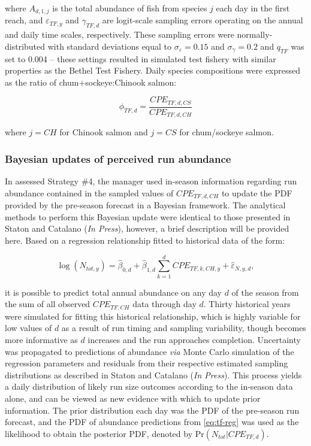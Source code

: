 \documentclass[12pt,]{book}
\theoremstyle{definition}
\theoremstyle{definition}
\theoremstyle{definition}
\theoremstyle{remark}
\begin{document}
\noindent
where \(A_{d,1,j}\) is the total abundance of fish from species \(j\)
each day in the first reach, and \(\varepsilon_{TF,y}\) and
\(\gamma_{TF,d}\) are logit-scale sampling errors operating on the
annual and daily time scales, respectively. These sampling errors were
normally-distributed with standard deviations equal to
\(\sigma_{\varepsilon} = 0.15\) and \(\sigma_{\gamma} = 0.2\) and
\(q_{TF}\) was set to 0.004 -- these settings resulted in simulated test
fishery with similar properties as the Bethel Test Fishery. Daily
species compositions were expressed as the ratio of chum+sockeye:Chinook
salmon:

\begin{equation}
  \phi_{TF,d} = \frac{CPE_{TF,d,CS}}{CPE_{TF,d,CH}}
  \label{eq:get-tf-ratio}
\end{equation}

\noindent
where \(j = CH\) for Chinook salmon and \(j = CS\) for chum/sockeye
salmon.

\subsubsection{Bayesian updates of perceived run
abundance}\label{bayes-updates}

\noindent
In assessed Strategy \#4, the manager used in-season information
regarding run abundance contained in the sampled values of
\(CPE_{TF,d,CH}\) to update the PDF provided by the pre-season forecast
in a Bayesian framework. The analytical methods to perform this Bayesian
update were identical to those presented in Staton and Catalano
(\textit{In Press}), however, a brief description will be provided here.
Based on a regression relationship fitted to historical data of the
form:

\begin{equation}
  \log(N_{tot,y}) = \hat{\beta}_{0,d} + \hat{\beta}_{1,d}\sum_{k=1}^d{CPE_{TF,k,CH,y}} + \hat{\varepsilon}_{N,y,d},
  \label{eq:tf-reg}
\end{equation}

\noindent
it is possible to predict total annual abundance on any day \(d\) of the
season from the sum of all observed \(CPE_{TF,CH}\) data through day
\(d\). Thirty historical years were simulated for fitting this
historical relationship, which is highly variable for low values of
\(d\) as a result of run timing and sampling variability, though becomes
more informative as \(d\) increases and the run approaches completion.
Uncertainty was propagated to predictions of abundance \emph{via} Monte
Carlo simulation of the regression parameters and residuals from their
respective estimated sampling distributions as described in Staton and
Catalano (\textit{In Press}). This process yields a daily distribution
of likely run size outcomes according to the in-season data alone, and
can be viewed as new evidence with which to update prior information.
The prior distribution each day was the PDF of the pre-season run
forecast, and the PDF of abundance predictions from \eqref{eq:tf-reg} was
used as the likelihood to obtain the posterior PDF, denoted by
\(\text{Pr}(N_{tot}|CPE_{TF,d})\).
\end{document}
